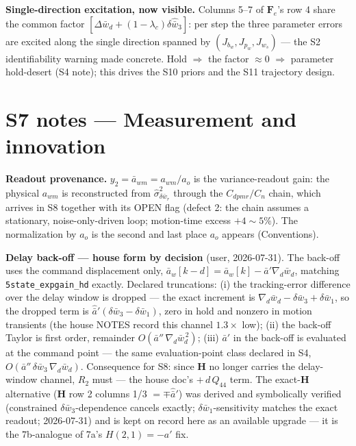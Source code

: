 \documentclass[11pt,a4paper,fontset=none]{ctexart}
\begin{document}
\textbf{Single-direction excitation, now visible.}  Columns 5--7 of
$\mathbf{F}_e$'s row 4 share the common factor
$[\Delta\bar{w}_d + (1-\lambda_c)\delta\hat{\bar{w}}_3]$: per step the
three parameter errors are excited along the single direction spanned by
$(J_{b_w}, J_{p_w}, J_{w_s})$ --- the S2 identifiability warning made
concrete.  Hold $\Rightarrow$ the factor $\approx 0$ $\Rightarrow$
parameter hold-desert (S4 note); this drives the S10 priors and the S11
trajectory design.

\section*{S7 notes --- Measurement and innovation}

\textbf{Readout provenance.}  $y_2 = \bar{a}_{wm} = a_{wm}/a_o$ is the
variance-readout gain: the physical $a_{wm}$ is reconstructed from
$\hat{\sigma}^2_{\delta\bar{w}_r}$ through the $C_{dpmr}/C_n$ chain, which
arrives in S8 together with its OPEN flag (defect 2: the chain assumes a
stationary, noise-only-driven loop; motion-time excess $+4\sim5\%$).  The
normalization by $a_o$ is the second and last place $a_o$ appears
(Conventions).

\textbf{Delay back-off --- house form by decision} (user, 2026-07-31).
The back-off uses the command displacement only,
$\bar{a}_w[k-d] = \bar{a}_w[k] - \bar{a}'\nabla_d\bar{w}_d$, matching
\texttt{5state\_expgain\_hd} exactly.  Declared truncations:
(i) the tracking-error difference over the delay window is dropped ---
the exact increment is $\nabla_d\bar{w}_d - \delta\bar{w}_3 +
\delta\bar{w}_1$, so the dropped term is
$\hat{\bar{a}}'(\delta\bar{w}_3 - \delta\bar{w}_1)$, zero in hold and
nonzero in motion transients (the house NOTES record this channel
$1.3\times$ low); (ii) the back-off Taylor is first order, remainder
$O(\bar{a}''\,\nabla_d\bar{w}_d^{\,2})$; (iii) $\bar{a}'$ in the back-off
is evaluated at the command point --- the same evaluation-point class
declared in S4, $O(\bar{a}''\,\delta\bar{w}_3\,\nabla_d\bar{w}_d)$.
Consequence for S8: since
$\mathbf{H}$ no longer carries the delay-window channel, $R_2$ must ---
the house doc's $+\,d\,Q_{44}$ term.  The exact-$\mathbf{H}$ alternative
($\mathbf{H}$ row 2 columns 1/3 $= \mp\hat{\bar{a}}'$) was derived and
symbolically verified (constrained $\delta\bar{w}_3$-dependence cancels
exactly; $\delta\bar{w}_1$-sensitivity matches the exact readout;
2026-07-31) and is kept on record here as an available upgrade --- it is
the 7b-analogue of 7a's $H(2,1) = -a'$ fix.
\end{document}
